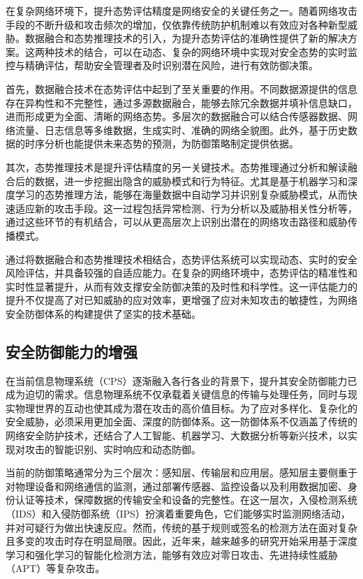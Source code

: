 在复杂网络环境下，提升态势评估精度是网络安全的关键任务之一。随着网络攻击手段的不断升级和攻击频次的增加，仅依靠传统防护机制难以有效应对各种新型威胁。数据融合和态势推理技术的引入，为提升态势评估的准确性提供了新的解决方案。这两种技术的结合，可以在动态、复杂的网络环境中实现对安全态势的实时监控与精确评估，帮助安全管理者及时识别潜在风险，进行有效防御决策。

首先，数据融合技术在态势评估中起到了至关重要的作用。不同数据源提供的信息存在异构性和不完整性，通过多源数据融合，能够去除冗余数据并填补信息缺口，进而形成更为全面、清晰的网络态势。多层次的数据融合可以结合传感器数据、网络流量、日志信息等多维数据，生成实时、准确的网络全貌图。此外，基于历史数据的时序分析也能提供未来态势的预测，为防御策略制定提供依据。

其次，态势推理技术是提升评估精度的另一关键技术。态势推理通过分析和解读融合后的数据，进一步挖掘出隐含的威胁模式和行为特征。尤其是基于机器学习和深度学习的态势推理方法，能够在海量数据中自动学习并识别复杂威胁模式，从而快速适应新的攻击手段。这一过程包括异常检测、行为分析以及威胁相关性分析等，通过这些环节的有机结合，可以从更高层次上识别出潜在的网络攻击路径和威胁传播模式。

通过将数据融合和态势推理技术相结合，态势评估系统可以实现动态、实时的安全风险评估，并具备较强的自适应能力。在复杂的网络环境中，态势评估的精准性和实时性显著提升，从而有效支撑安全防御决策的及时性和科学性。这一评估能力的提升不仅提高了对已知威胁的应对效率，更增强了应对未知攻击的敏捷性，为网络安全防御体系的构建提供了坚实的技术基础。

\subsection{安全防御能力的增强}

在当前信息物理系统（CPS）逐渐融入各行各业的背景下，提升其安全防御能力已成为迫切的需求。信息物理系统不仅承载着关键信息的传输与处理任务，同时与现实物理世界的互动也使其成为潜在攻击的高价值目标。为了应对多样化、复杂化的安全威胁，必须采用更加全面、深度的防御体系。这一防御体系不仅涵盖了传统的网络安全防护技术，还结合了人工智能、机器学习、大数据分析等新兴技术，以实现对攻击的智能识别、实时响应和动态防御。

当前的防御策略通常分为三个层次：感知层、传输层和应用层。感知层主要侧重于对物理设备和网络通信的监测，通过部署传感器、监控设备以及利用数据加密、身份认证等技术，保障数据的传输安全和设备的完整性。在这一层次，入侵检测系统（IDS）和入侵防御系统（IPS）扮演着重要角色，它们能够实时监测网络活动，并对可疑行为做出快速反应。然而，传统的基于规则或签名的检测方法在面对复杂且多变的攻击时存在明显局限。因此，近年来，越来越多的研究开始采用基于深度学习和强化学习的智能化检测方法，能够有效应对零日攻击、先进持续性威胁（APT）等复杂攻击。


